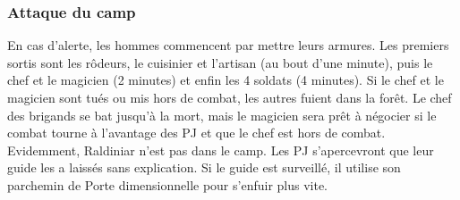 \documentclass[a4paper,10pt,openany]{book}
\begin{document}
\begin{multicols}{2}
\subsubsection{Attaque du camp}
En cas d’alerte, les hommes commencent par mettre leurs armures. Les premiers sortis sont les rôdeurs, le cuisinier et l’artisan (au bout d’une minute), puis le chef et le magicien (2 minutes) et enfin les 4 soldats (4 minutes).
Si le chef et le magicien sont tués ou mis hors de combat, les autres fuient dans la forêt.
Le chef des brigands se bat jusqu’à la mort, mais le magicien sera prêt à négocier si le combat tourne à l’avantage des PJ et que le chef est hors de combat.
Evidemment, Raldiniar n’est pas dans le camp. Les PJ s’apercevront que leur guide les a laissés sans explication. Si le guide est surveillé, il utilise son parchemin de Porte dimensionnelle pour s’enfuir plus vite.

\end{multicols}


\end{document}
